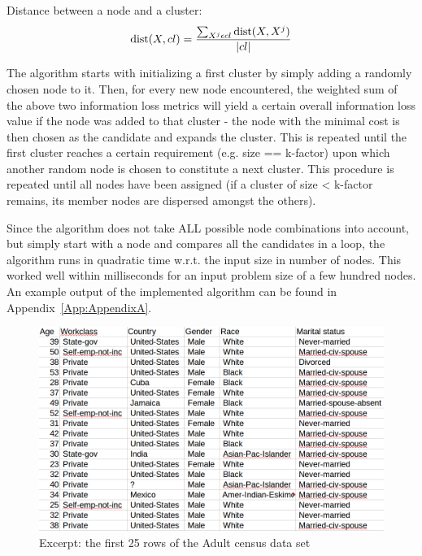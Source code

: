 \begin{enumerate}
		Distance between a node and a cluster:
		\begin{equation*}
		\text{dist}(X, cl) = \frac{\sum_{X^j \epsilon cl} \text{dist}(X, X^j) }{\lvert cl\rvert}
		\end{equation*}
	\end{enumerate}
	
	The algorithm starts with initializing a first cluster by simply adding a randomly chosen node to it. Then, for every new node encountered, the weighted sum of the above two information loss metrics will yield a certain overall information loss value if the node was added to that cluster - the node with the minimal cost is then chosen as the candidate and expands the cluster. This is repeated until the first cluster reaches a certain requirement (e.g. size == k-factor) upon which another random node is chosen to constitute a next cluster. This procedure is repeated until all nodes have been assigned (if a cluster of size < k-factor remains, its member nodes are dispersed amongst the others). 
	
	Since the algorithm does not take ALL possible node combinations into account, but simply start with a node and compares all the candidates in a loop, the algorithm runs in quadratic time w.r.t. the input size in number of nodes. This worked well within milliseconds for an input problem size of a few hundred nodes. An example output of the implemented algorithm can be found in Appendix~\ref{App:AppendixA}. \\
	
	
	\begin{figure}[ht]
		\begin{center}
			\includegraphics[width=1\textwidth]{figures/anonym/anon_adults_input_sample_pic}
			\caption{Excerpt: the first 25 rows of the Adult census data set}
			\label{fig:adult_input_data_sample}
		\end{center}
	\end{figure}



